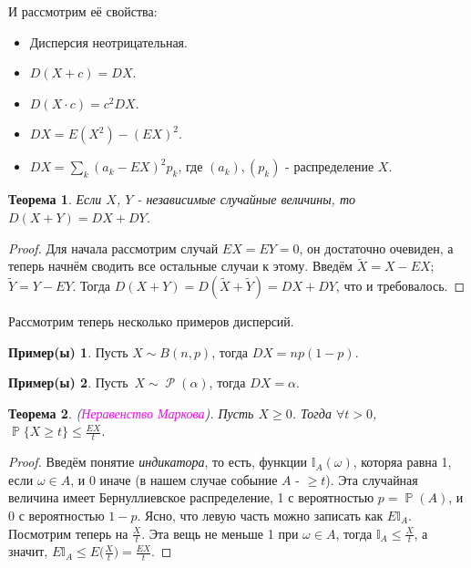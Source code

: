 \documentclass[a4paper,100pt]{article}
\theoremstyle{indented}
\newtheorem{theorem}{Теорема}
\theoremstyle{definition}
\newtheorem{exl}{Пример(ы)}
\theoremstyle{remark}
\DeclareMathOperator{\PP}{\mathbb{P}}
\DeclareMathOperator{\Rho}{\mathcal{P}}
\begin{document}
И рассмотрим её свойства:

\begin{itemize}
  \item Дисперсия неотрицательная.
  \item $D(X+c)=DX$.
  \item $D(X\cdot c)=c^2 DX$.
  \item $DX = E(X^2) - (EX)^2$.
  \item $DX=\sum_k(a_k- EX)^2p_k$, где $(a_k), (p_k)$ - распределение $X$. 
\end{itemize}

\begin{theorem}
  Если $X$, $Y$ - независимые случайные величины, то $D(X+Y)=DX+DY$. 
\end{theorem}

\begin{proof}
  Для начала рассмотрим случай $EX=EY=0$, он достаточно очевиден, а теперь начнём сводить все остальные случаи к этому. Введём $\tilde{X}=X-EX$; $\tilde{Y}=Y-EY$. Тогда $D(X+Y)=D(\tilde{X}+\tilde{Y})=DX+DY$, что и требовалось.
\end{proof}

Рассмотрим теперь несколько примеров дисперсий.

\begin{exl}
  Пусть $X\sim B(n, p)$, тогда $DX=np(1-p)$. 
\end{exl}

\begin{exl}
  Пусть $X\sim \Rho(\alpha)$, тогда $DX = \alpha$. 
\end{exl}

\begin{theorem}  
  (\hypertarget{n15}{\textcolor{magenta}{\textit{Неравенство Маркова}}}). Пусть $X\geq 0$. Тогда $\forall t>0$, $\PP\{X \geq t\}\leq \frac{EX}{t}$.
\end{theorem}

\begin{proof}
  Введём понятие \textit{индикатора}, то есть, функции $\mathbb{I}_A(\omega)$, которяа равна 1, если $\omega \in A$, и 0 иначе (в нашем случае собыние $A$ - $\geq t$). Эта случайная величина имеет Бернуллиевское распределение, 1 с вероятностью $p=\PP(A)$, и 0 с вероятностью $1-p$. Ясно, что левую часть можно записать как $E\mathbb{I}_A$. Посмотрим теперь на $\frac{X}{t}$. Эта вещь не меньше 1 при $\omega \in A$, тогда $\mathbb{I}_A\leq \frac{X}{t}$, а значит, $E \mathbb{I}_A\leq E\biggl(\frac{X}{t}\biggr)=\frac{EX}{t}$. 
\end{proof}
\end{document}
